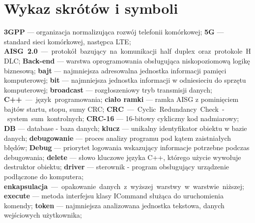 \chapter*{Wykaz skrótów i symboli}
\noindent
\textbf{3GPP} --- organizacja normalizująca rozwój telefonii komórkowej;\newline
\textbf{5G} --- standard sieci komórkowej, następca LTE;\newline
\textbf{AISG 2.0} --- protokół bazujący na komunikacji half duplex oraz protokole HDLC;\newline
\textbf{Back-end} --- warstwa oprogramowania obsługująca niskopoziomową logikę biznesową;\newline
\textbf{bajt} --- najmniejsza adresowalna jednostka informacji pamięci komputerowej;\newline
\textbf{bit} --- najmniejsza jednostka informacji w odniesieciu do sprzętu komputerowej;\newline
\textbf{broadcast} --- rozgłoszeniowy tryb transmisji danych;\newline
\textbf{C++} --- język programowania;\newline
\textbf{ciało ramki} --- ramka AISG z pominięciem bajtów startu, stopu, sumy CRC;\newline
\textbf{CRC} --- Cyclic Redundancy Check - system sum kontrolnych;\newline
\textbf{CRC-16} --- 16-bitowy cykliczny kod nadmiarowy;\newline
\textbf{DB} --- database - baza danych;\newline
\textbf{klucz} --- unikalny identyfikator obiektu w bazie danych;
\textbf{debugowanie} --- proces analizy programu pod kątem zaistniałych błędów;\newline
\textbf{Debug} --- priorytet logowania wskazujący informacje potrzebne podczas debugowania;\newline
\textbf{delete} --- słowo kluczowe języka C++, którego użycie wywołuje destruktor obiektu;\newline
\textbf{driver} --- sterownik - program obsługujący urządzenie podłączone do komputera;\newline
\textbf{enkapsulacja} --- opakowanie danych z wyższej warstwy w warstwie niższej;\newline
\textbf{execute} --- metoda interfejsu klasy ICommand służąca do uruchomienia komendy;\newline
\textbf{token} --- najmniejsza analizowana jednostka tekstowa, danych wejściowych użytkownika;\newline
